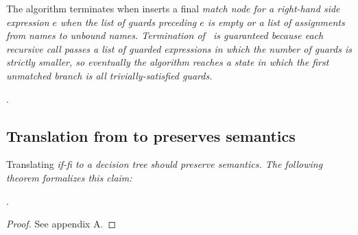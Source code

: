 \documentclass[manuscript,screen,review, 12pt, nonacm]{acmart}
\begin{document}
    The algorithm terminates when inserts a final \it{match} node for a
    right-hand side expression $e$ when the list of guards preceding $e$ is
    empty or a list of assignments from names to unbound names. Termination of
    \DTran\ is guaranteed because each recursive call passes a list of guarded
    expressions in which the number of guards is strictly smaller, so eventually
    the algorithm reaches a state in which the first unmatched branch is all
    trivially-satisfied guards. 

       
    
    
    
    
    .

    \subsection{Translation from \VMinus to \D preserves semantics}
    
    Translating \it{if-fi} to a decision tree should preserve semantics. The
    following theorem formalizes this claim: 

    . 
    
    \begin{proof}
        See appendix A. 
    \end{proof}
\end{document}

